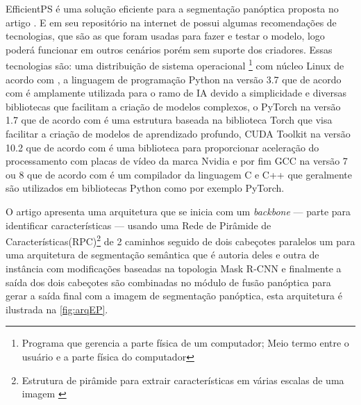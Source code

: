 \label{sec:EfficientPS}

EfficientPS é uma solução eficiente para a segmentação panóptica proposta no artigo . E em seu repositório na internet de  possui algumas recomendações de tecnologias, que são as que foram usadas para fazer e testar o modelo, logo poderá funcionar em outros cenários porém sem suporte dos criadores. Essas tecnologias são: uma distribuição de sistema operacional \footnote{Programa que gerencia a parte física de um computador; Meio termo entre o usuário e a parte física do computador} com núcleo Linux de acordo com , a linguagem de programação Python na versão 3.7 que de acordo com  é amplamente utilizada para o ramo de IA devido a simplicidade e diversas bibliotecas que facilitam a criação de modelos complexos, o PyTorch na versão 1.7 que de acordo com  é uma estrutura baseada na biblioteca Torch que visa facilitar a criação de modelos de aprendizado profundo, CUDA Toolkit na versão 10.2 que de acordo com  é uma biblioteca para proporcionar aceleração do processamento com placas de vídeo da marca Nvidia e por fim GCC na versão 7 ou 8 que de acordo com  é um compilador da linguagem C e C++ que geralmente são utilizados em bibliotecas Python como por exemplo PyTorch.


O artigo apresenta uma arquitetura que se inicia com um \textit{backbone} — parte para identificar características — usando uma Rede de Pirâmide de Características(RPC)\footnote{Estrutura de pirâmide para extrair características em várias escalas de uma imagem \space\cite{piramide}} de 2 caminhos seguido de dois cabeçotes paralelos um para uma arquitetura de segmentação semântica que é autoria deles e outra de instância com modificações baseadas na topologia Mask R-CNN e finalmente a saída dos dois cabeçotes são combinadas no módulo de fusão panóptica para gerar a saída final com a imagem de segmentação panóptica, esta arquitetura é ilustrada na \cref{fig:arqEP}.

